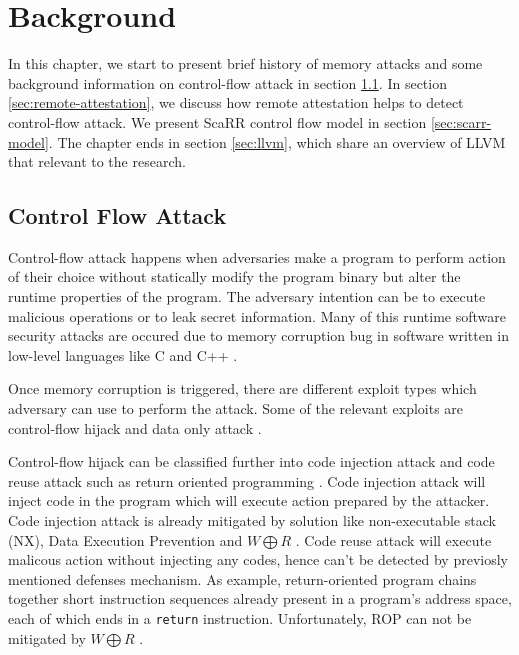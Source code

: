 
\chapter{Background} %

\label{Chapter3} %

In this chapter, we start to present brief history of memory attacks and some background information on control-flow attack in section \ref{sec:control-flow-attack}. In section \ref{sec:remote-attestation}, we discuss how remote attestation helps to detect control-flow attack. We present ScaRR control flow model in section \ref{sec:scarr-model}. The chapter ends in section \ref{sec:llvm}, which share an overview of LLVM that relevant to the research. 

\section{Control Flow Attack}
\label{sec:control-flow-attack}

Control-flow attack happens when adversaries make a program to perform action of their choice without statically modify the program binary but alter the runtime properties of the program. The adversary intention can be to execute malicious operations or to leak secret information. Many of this runtime software security attacks are occured due to memory corruption bug in software written in low-level languages like C and C++ \cite{szekeresSoKEternalWar2013}.

Once memory corruption is triggered, there are different exploit types which adversary can use to perform the attack. Some of the relevant exploits are control-flow hijack \cite{shachamGeometryInnocentFlesh2007, schusterCounterfeitObjectorientedProgramming2015}  and data only attack \cite{chenNonControlDataAttacksAre2005, carliniControlFlowBendingEffectiveness2015}. 

Control-flow hijack can be classified further into code injection attack and code reuse attack such as return oriented programming \cite{roemerReturnorientedProgrammingSystems2012}.  Code injection attack will inject code in the program which will execute action prepared by the attacker. Code injection attack is already mitigated by solution like non-executable stack (NX), Data Execution Prevention and \( W \bigoplus R \) \cite{vanderveenMemoryErrorsPresent2012}. Code reuse attack will execute malicous action without injecting any codes, hence can't be detected by previosly mentioned defenses mechanism. As example, return-oriented program chains together short instruction sequences already present in a program’s address space, each of which ends in a \texttt{return} instruction. Unfortunately, ROP can not be mitigated by \( W \bigoplus R \) \cite{roemerReturnorientedProgrammingSystems2012}.

